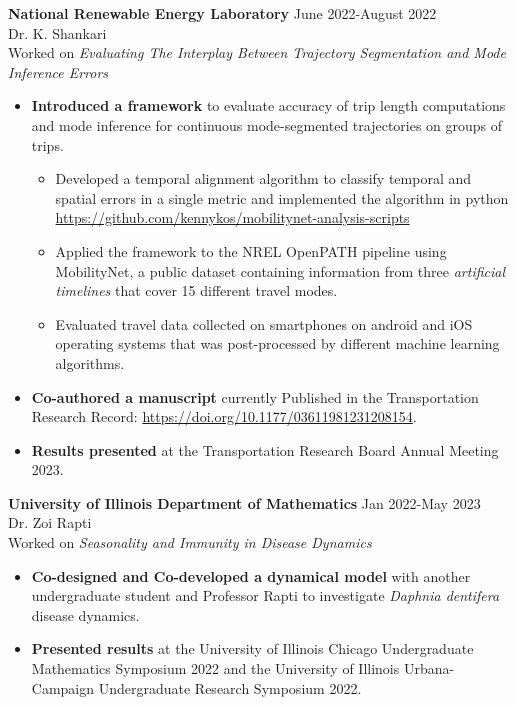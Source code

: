 \documentclass[resmargin, 10pt]{res} %
\begin{document}
\begin{resume}
{\bf National Renewable Energy Laboratory} \hfill June 2022-August 2022 \\
Dr. K. Shankari \\
Worked on {\sl  Evaluating The Interplay Between Trajectory Segmentation and Mode Inference Errors}
\begin{itemize}[itemsep=0em]
    \item \textbf{Introduced a framework} to evaluate accuracy of trip length computations and mode inference for continuous mode-segmented trajectories on groups of trips. 
    \begin{itemize}[itemsep=0em]
        \item Developed a temporal alignment algorithm to classify temporal and spatial errors in a single metric and implemented the algorithm in python \url{https://github.com/kennykos/mobilitynet-analysis-scripts}
        \item Applied the framework to the NREL OpenPATH pipeline using MobilityNet, a public dataset containing information from three \emph{artificial timelines} that cover 15 different travel modes.
        \item Evaluated travel data collected on smartphones on android and iOS operating systems that was post-processed by different machine learning  algorithms.
    \end{itemize}
    \item \textbf{Co-authored a manuscript} currently Published in the Transportation Research Record: \url{https://doi.org/10.1177/03611981231208154}.
    \item \textbf{Results presented} at the Transportation Research Board Annual Meeting 2023.
\end{itemize}

\vspace{-8pt}
{\bf University of Illinois Department of Mathematics} \hfill Jan 2022-May 2023 \\
Dr. Zoi Rapti \\
Worked on {\sl Seasonality and Immunity in Disease Dynamics}
\begin{itemize}[itemsep=0em]
    \item \textbf{Co-designed and Co-developed a dynamical model} with another undergraduate student and Professor Rapti to investigate {\it Daphnia dentifera} disease dynamics.
    \item \textbf{Presented results} at the University of Illinois Chicago Undergraduate Mathematics Symposium 2022 and the University of Illinois Urbana-Campaign Undergraduate Research Symposium 2022.
\end{itemize}


\end{resume}
\end{document}
